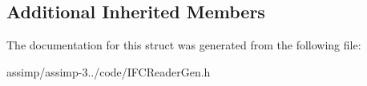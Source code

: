 \subsection*{Additional Inherited Members}


The documentation for this struct was generated from the following file\+:\begin{DoxyCompactItemize}
\item 
assimp/assimp-\/3../code/I\+F\+C\+Reader\+Gen.\+h\end{DoxyCompactItemize}
